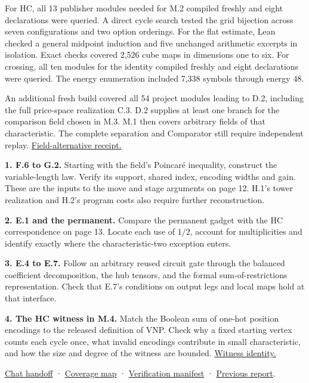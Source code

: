 \documentclass[11pt,letterpaper]{article}
\newcommand{\subhead}[1]{\par\addvspace{7pt}{\large\bfseries\color{ink}#1\par}\nobreak}
\newcommand{\pub}[3]{\href{https://github.com/anthropics/formal-math/blob/11b6c7e3c927df2658f513b6b68ea7f8929c62c5/vp-vnp/#1\#L#2}{#3}}
\newcommand{\review}[2]{\href{https://github.com/nousentllc/VP-VNP-Review/blob/33edc6eb465bb2c565e82d3461fd418c1890d65e/#1}{#2}}
\newcommand{\currentreview}[2]{\href{https://github.com/nousentllc/VP-VNP-Review/blob/e66f5c5257493c2548903380bfc6a72fb0289c7b/#1}{#2}}
\newcommand{\smallref}[1]{{\small\sffamily\color{muted}#1\par}}
\begin{document}
For HC, all 13 publisher modules needed for M.2 compiled freshly and eight declarations were queried. A direct cycle search tested the grid bijection across seven configurations and two option orderings. For the flat estimate, Lean checked a general midpoint induction and five unchanged arithmetic excerpts in isolation. Exact checks covered 2,526 cube maps in dimensions one to six. For crossing, all ten modules for the identity compiled freshly and eight declarations were queried. The energy enumeration included 7,338 symbols through energy 48.

An additional fresh build covered all 54 project modules leading to D.2, including the full price-space realization C.3. D.2 supplies at least one branch for the comparison field chosen in M.3. M.1 then covers arbitrary fields of that characteristic. The complete separation and Comparator still require independent replay. \currentreview{checks/pass12e_alternative_replay.json}{Field-alternative receipt.}

\subhead{Four questions carried into pass 13}
\textbf{1. F.6 to G.2.} Starting with the field's Poincaré inequality, construct the variable-length law. Verify its support, shared index, encoding widths and gain. These are the inputs to the move and stage arguments on page 12. H.1's tower realization and H.2's program costs also require further reconstruction.

\textbf{2. E.1 and the permanent.} Compare the permanent gadget with the HC correspondence on page 13. Locate each use of $1/2$, account for multiplicities and identify exactly where the characteristic-two exception enters.

\textbf{3. E.4 to E.7.} Follow an arbitrary reused circuit gate through the balanced coefficient decomposition, the hub tensors, and the formal sum-of-restrictions representation. Check that E.7's conditions on output legs and local maps hold at that interface.

\textbf{4. The HC witness in M.4.} Match the Boolean sum of one-hot position encodings to the released definition of VNP. Check why a fixed starting vertex counts each cycle once, what invalid encodings contribute in small characteristic, and how the size and degree of the witness are bounded. \pub{Nc/Hc/Vnp.lean}{189}{Witness identity.}

\smallref{\currentreview{VP_VNP_Chat_Handoff.md}{Chat handoff} · \currentreview{report/proof-coverage.csv}{Coverage map} · \currentreview{source-lock.json}{Verification manifest} · \review{report/VP_VNP_Research_Review.pdf}{Previous report}.}
















\end{document}
